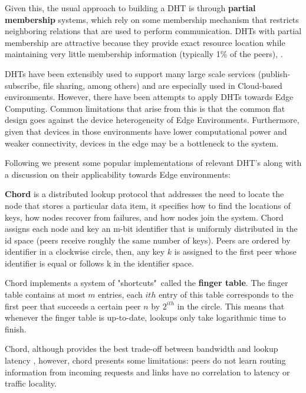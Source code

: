 Given this, the usual approach to building a DHT is through \textbf{partial membership} systems, which rely on some membership mechanism that restricts neighboring relations that are used to perform communication. DHTs with partial membership are attractive because they provide exact resource location while maintaining very little membership information (typically 1\% of the peers), . 

DHTs have been extensibly used to support many large scale services (publish-subscribe, file sharing, among others) and are especially used in Cloud-based environments. However, there have been attempts to apply DHTs towards Edge Computing. Common limitations that arise from this is that the common flat design goes against the device heterogeneity of Edge Environments. Furthermore, given that devices in those environments have lower computational power and weaker connectivity, devices in the edge may be a bottleneck to the system. 

Following we present some popular implementations of relevant DHT's along with a discussion on their applicability towards Edge environments:

\textbf{Chord} \cite{stoica2003chord} is a distributed lookup protocol that addresses the need to locate the node that stores a particular data item, it specifies how to find the locations of keys, how nodes recover from failures, and how nodes join the system. Chord assigns each node and key an m-bit identifier that is uniformly distributed in the id space (peers receive roughly the same number of keys). Peers are ordered by identifier in a clockwise circle, then, any key \(k\) is assigned to the first peer whose identifier is equal or follows k in the identifier space. 

Chord implements a system of "shortcuts"\ called the \textbf{finger table}. The finger table contains at most \(m\) entries, each $ith$ entry of this table corresponds to the first peer that succeeds a certain peer \(n\) by \(2^{ith}\) in the circle. This means that whenever the finger table is up-to-date, lookups only take logarithmic time to finish. 

Chord, although provides the best trade-off between bandwidth and lookup latency \cite{dht_performance_churn}, however, chord presents some limitations: peers do not learn routing information from incoming requests and links have no correlation to latency or traffic locality.


